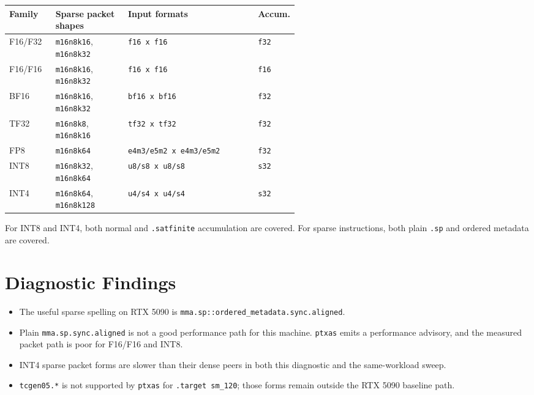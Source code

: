 \documentclass[10pt]{article}
\begin{document}
\begin{center}
\small
\begin{tabularx}{\linewidth}{L{0.16\linewidth}L{0.25\linewidth}Y L{0.14\linewidth}}
\toprule
Family & Sparse packet shapes & Input formats & Accum. \\
\midrule
F16/F32 & \texttt{m16n8k16}, \texttt{m16n8k32} & \texttt{f16 x f16} & \texttt{f32} \\
F16/F16 & \texttt{m16n8k16}, \texttt{m16n8k32} & \texttt{f16 x f16} & \texttt{f16} \\
BF16 & \texttt{m16n8k16}, \texttt{m16n8k32} & \texttt{bf16 x bf16} & \texttt{f32} \\
TF32 & \texttt{m16n8k8}, \texttt{m16n8k16} & \texttt{tf32 x tf32} & \texttt{f32} \\
FP8 & \texttt{m16n8k64} & \texttt{e4m3/e5m2 x e4m3/e5m2} & \texttt{f32} \\
INT8 & \texttt{m16n8k32}, \texttt{m16n8k64} & \texttt{u8/s8 x u8/s8} & \texttt{s32} \\
INT4 & \texttt{m16n8k64}, \texttt{m16n8k128} & \texttt{u4/s4 x u4/s4} & \texttt{s32} \\
\bottomrule
\end{tabularx}
\end{center}

For INT8 and INT4, both normal and \texttt{.satfinite} accumulation are
covered. For sparse instructions, both plain \texttt{.sp} and ordered metadata
are covered.

\section{Diagnostic Findings}

\begin{itemize}
\item The useful sparse spelling on RTX 5090 is
\texttt{mma.sp::ordered\_metadata.sync.aligned}.
\item Plain \texttt{mma.sp.sync.aligned} is not a good performance path for this
machine. \texttt{ptxas} emits a performance advisory, and the measured packet
path is poor for F16/F16 and INT8.
\item INT4 sparse packet forms are slower than their dense peers in both this
diagnostic and the same-workload sweep.
\item \texttt{tcgen05.*} is not supported by \texttt{ptxas} for
\texttt{.target sm\_120}; those forms remain outside the RTX 5090 baseline path.
\end{itemize}
\end{document}
